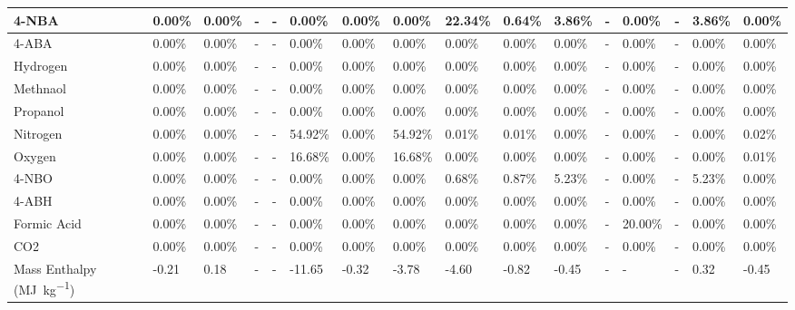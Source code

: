 \begin{landscape}
\begin{table}[H]
\begin{tabular}{|l|l|l|l|l|l|l|l|l|l|l|l|l|l|l|l|}
4-NBA                   & 0.00\%   & 0.00\%   & -    & -    & 0.00\%  & 0.00\%   & 0.00\%  & 22.34\% & 0.64\%  & 3.86\%  & -    & 0.00\%  & -    & 3.86\%  & 0.00\%  \\ \hline
4-ABA                   & 0.00\%   & 0.00\%   & -    & -    & 0.00\%  & 0.00\%   & 0.00\%  & 0.00\%  & 0.00\%  & 0.00\%  & -    & 0.00\%  & -    & 0.00\%  & 0.00\%  \\ \hline
Hydrogen                & 0.00\%   & 0.00\%   & -    & -    & 0.00\%  & 0.00\%   & 0.00\%  & 0.00\%  & 0.00\%  & 0.00\%  & -    & 0.00\%  & -    & 0.00\%  & 0.00\%  \\ \hline
Methnaol                & 0.00\%   & 0.00\%   & -    & -    & 0.00\%  & 0.00\%   & 0.00\%  & 0.00\%  & 0.00\%  & 0.00\%  & -    & 0.00\%  & -    & 0.00\%  & 0.00\%  \\ \hline
Propanol                & 0.00\%   & 0.00\%   & -    & -    & 0.00\%  & 0.00\%   & 0.00\%  & 0.00\%  & 0.00\%  & 0.00\%  & -    & 0.00\%  & -    & 0.00\%  & 0.00\%  \\ \hline
Nitrogen                & 0.00\%   & 0.00\%   & -    & -    & 54.92\% & 0.00\%   & 54.92\% & 0.01\%  & 0.01\%  & 0.00\%  & -    & 0.00\%  & -    & 0.00\%  & 0.02\%  \\ \hline
Oxygen                  & 0.00\%   & 0.00\%   & -    & -    & 16.68\% & 0.00\%   & 16.68\% & 0.00\%  & 0.00\%  & 0.00\%  & -    & 0.00\%  & -    & 0.00\%  & 0.01\%  \\ \hline
4-NBO                   & 0.00\%   & 0.00\%   & -    & -    & 0.00\%  & 0.00\%   & 0.00\%  & 0.68\%  & 0.87\%  & 5.23\%  & -    & 0.00\%  & -    & 5.23\%  & 0.00\%  \\ \hline
4-ABH                   & 0.00\%   & 0.00\%   & -    & -    & 0.00\%  & 0.00\%   & 0.00\%  & 0.00\%  & 0.00\%  & 0.00\%  & -    & 0.00\%  & -    & 0.00\%  & 0.00\%  \\ \hline
Formic Acid             & 0.00\%   & 0.00\%   & -    & -    & 0.00\%  & 0.00\%   & 0.00\%  & 0.00\%  & 0.00\%  & 0.00\%  & -    & 20.00\% & -    & 0.00\%  & 0.00\%  \\ \hline
CO2                     & 0.00\%   & 0.00\%   & -    & -    & 0.00\%  & 0.00\%   & 0.00\%  & 0.00\%  & 0.00\%  & 0.00\%  & -    & 0.00\%  & -    & 0.00\%  & 0.00\%  \\ \hline
Mass Enthalpy (\si{\mega\J\per\kg})    & -0.21    & 0.18     & -    & -    & -11.65  & -0.32    & -3.78   & -4.60   & -0.82   & -0.45   & -    & -       & -    & 0.32    & -0.45   \\ \hline
\end{tabular}
\end{table}



\end{landscape}
